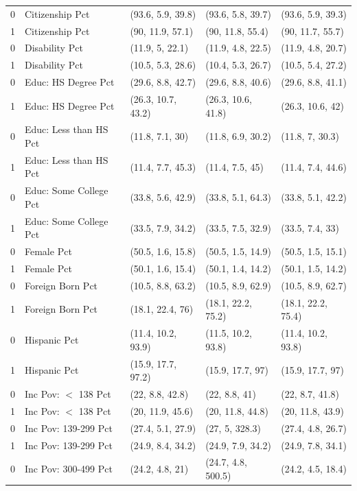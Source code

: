 \begin{table}[ht]
\begin{tabular}{rllll}
  0 & Citizenship Pct & (93.6, 5.9, 39.8) & (93.6, 5.8, 39.7) & (93.6, 5.9, 39.3) \\ 
  1 & Citizenship Pct & (90, 11.9, 57.1) & (90, 11.8, 55.4) & (90, 11.7, 55.7) \\ 
  0 & Disability Pct & (11.9, 5, 22.1) & (11.9, 4.8, 22.5) & (11.9, 4.8, 20.7) \\ 
  1 & Disability Pct & (10.5, 5.3, 28.6) & (10.4, 5.3, 26.7) & (10.5, 5.4, 27.2) \\ 
  0 & Educ: HS Degree Pct & (29.6, 8.8, 42.7) & (29.6, 8.8, 40.6) & (29.6, 8.8, 41.1) \\ 
  1 & Educ: HS Degree Pct & (26.3, 10.7, 43.2) & (26.3, 10.6, 41.8) & (26.3, 10.6, 42) \\ 
  0 & Educ: Less than HS Pct & (11.8, 7.1, 30) & (11.8, 6.9, 30.2) & (11.8, 7, 30.3) \\ 
  1 & Educ: Less than HS Pct & (11.4, 7.7, 45.3) & (11.4, 7.5, 45) & (11.4, 7.4, 44.6) \\ 
  0 & Educ: Some College Pct & (33.8, 5.6, 42.9) & (33.8, 5.1, 64.3) & (33.8, 5.1, 42.2) \\ 
  1 & Educ: Some College Pct & (33.5, 7.9, 34.2) & (33.5, 7.5, 32.9) & (33.5, 7.4, 33) \\ 
  0 & Female Pct & (50.5, 1.6, 15.8) & (50.5, 1.5, 14.9) & (50.5, 1.5, 15.1) \\ 
  1 & Female Pct & (50.1, 1.6, 15.4) & (50.1, 1.4, 14.2) & (50.1, 1.5, 14.2) \\ 
  0 & Foreign Born Pct & (10.5, 8.8, 63.2) & (10.5, 8.9, 62.9) & (10.5, 8.9, 62.7) \\ 
  1 & Foreign Born Pct & (18.1, 22.4, 76) & (18.1, 22.2, 75.2) & (18.1, 22.2, 75.4) \\ 
  0 & Hispanic Pct & (11.4, 10.2, 93.9) & (11.5, 10.2, 93.8) & (11.4, 10.2, 93.8) \\ 
  1 & Hispanic Pct & (15.9, 17.7, 97.2) & (15.9, 17.7, 97) & (15.9, 17.7, 97) \\ 
  0 & Inc Pov: $<$ 138 Pct & (22, 8.8, 42.8) & (22, 8.8, 41) & (22, 8.7, 41.8) \\ 
  1 & Inc Pov: $<$ 138 Pct & (20, 11.9, 45.6) & (20, 11.8, 44.8) & (20, 11.8, 43.9) \\ 
  0 & Inc Pov: 139-299 Pct & (27.4, 5.1, 27.9) & (27, 5, 328.3) & (27.4, 4.8, 26.7) \\ 
  1 & Inc Pov: 139-299 Pct & (24.9, 8.4, 34.2) & (24.9, 7.9, 34.2) & (24.9, 7.8, 34.1) \\ 
  0 & Inc Pov: 300-499 Pct & (24.2, 4.8, 21) & (24.7, 4.8, 500.5) & (24.2, 4.5, 18.4) \\ 

\end{tabular}
\end{table}
